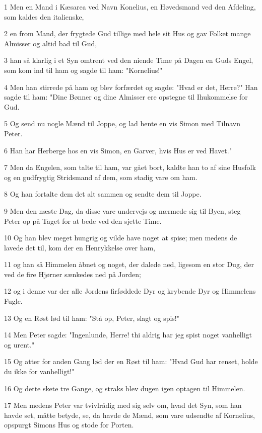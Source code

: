 \par 1 Men en Mand i Kæsarea ved Navn Konelius, en Høvedsmand ved den Afdeling, som kaldes den italienske,
\par 2 en from Mand, der frygtede Gud tillige med hele sit Hus og gav Folket mange Almisser og altid bad til Gud,
\par 3 han så klarlig i et Syn omtrent ved den niende Time på Dagen en Guds Engel, som kom ind til ham og sagde til ham: "Kornelius!"
\par 4 Men han stirrede på ham og blev forfærdet og sagde: "Hvad er det, Herre?" Han sagde til ham: "Dine Bønner og dine Almisser ere opstegne til Ihukommelse for Gud.
\par 5 Og send nu nogle Mænd til Joppe, og lad hente en vis Simon med Tilnavn Peter.
\par 6 Han har Herberge hos en vis Simon, en Garver, hvis Hus er ved Havet."
\par 7 Men da Engelen, som talte til ham, var gået bort, kaldte han to af sine Husfolk og en gudfrygtig Stridsmand af dem, som stadig vare om ham.
\par 8 Og han fortalte dem det alt sammen og sendte dem til Joppe.
\par 9 Men den næste Dag, da disse vare undervejs og nærmede sig til Byen, steg Peter op på Taget for at bede ved den sjette Time.
\par 10 Og han blev meget hungrig og vilde have noget at spise; men medens de lavede det til, kom der en Henrykkelse over ham,
\par 11 og han så Himmelen åbnet og noget, der dalede ned, ligesom en stor Dug, der ved de fire Hjørner sænkedes ned på Jorden;
\par 12 og i denne var der alle Jordens firføddede Dyr og krybende Dyr og Himmelens Fugle.
\par 13 Og en Røst lød til ham: "Stå op, Peter, slagt og spis!"
\par 14 Men Peter sagde: "Ingenlunde, Herre! thi aldrig har jeg spist noget vanhelligt og urent."
\par 15 Og atter for anden Gang lød der en Røst til ham: "Hvad Gud har renset, holde du ikke for vanhelligt!"
\par 16 Og dette skete tre Gange, og straks blev dugen igen optagen til Himmelen.
\par 17 Men medens Peter var tvivlrådig med sig selv om, hvad det Syn, som han havde set, måtte betyde, se, da havde de Mænd, som vare udsendte af Kornelius, opspurgt Simons Hus og stode for Porten.
